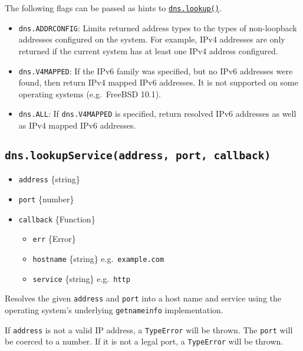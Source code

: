 The following flags can be passed as hints to
\hyperref[dnslookuphostname-options-callback]{\texttt{dns.lookup()}}.

\begin{itemize}
\tightlist
\item
  \texttt{dns.ADDRCONFIG}: Limits returned address types to the types of
  non-loopback addresses configured on the system. For example, IPv4
  addresses are only returned if the current system has at least one
  IPv4 address configured.
\item
  \texttt{dns.V4MAPPED}: If the IPv6 family was specified, but no IPv6
  addresses were found, then return IPv4 mapped IPv6 addresses. It is
  not supported on some operating systems (e.g.~FreeBSD 10.1).
\item
  \texttt{dns.ALL}: If \texttt{dns.V4MAPPED} is specified, return
  resolved IPv6 addresses as well as IPv4 mapped IPv6 addresses.
\end{itemize}

\subsection{\texorpdfstring{\texttt{dns.lookupService(address,\ port,\ callback)}}{dns.lookupService(address, port, callback)}}\label{dns.lookupserviceaddress-port-callback}

\begin{itemize}
\tightlist
\item
  \texttt{address} \{string\}
\item
  \texttt{port} \{number\}
\item
  \texttt{callback} \{Function\}

  \begin{itemize}
  \tightlist
  \item
    \texttt{err} \{Error\}
  \item
    \texttt{hostname} \{string\} e.g.~\texttt{example.com}
  \item
    \texttt{service} \{string\} e.g.~\texttt{http}
  \end{itemize}
\end{itemize}

Resolves the given \texttt{address} and \texttt{port} into a host name
and service using the operating system's underlying \texttt{getnameinfo}
implementation.

If \texttt{address} is not a valid IP address, a \texttt{TypeError} will
be thrown. The \texttt{port} will be coerced to a number. If it is not a
legal port, a \texttt{TypeError} will be thrown.

